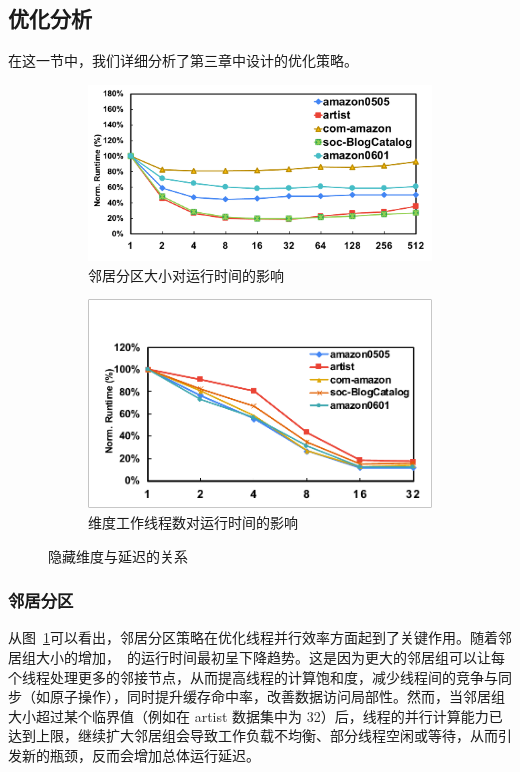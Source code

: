\subsection{优化分析}
在这一节中，我们详细分析了第三章中设计的优化策略。
\begin{figure}[htbp]
    \centering
    \begin{subfigure}[b]{0.48\textwidth}
        \centering
        \includegraphics[width=\textwidth]{images/group-size-study.pdf}
        \caption{邻居分区大小对运行时间的影响}
        \label{fig:group-size-study}
    \end{subfigure}
    \hfill
    \begin{subfigure}[b]{0.48\textwidth}
        \centering
        \includegraphics[width=\textwidth]{images/dimension-worker-1.pdf}
        \caption{维度工作线程数对运行时间的影响}
        \label{fig:dimension-worker}
    \end{subfigure}
    \caption{隐藏维度与延迟的关系}
    \label{fig:关于邻居分区和维度分区的研究}
\end{figure}
\subsubsection{邻居分区}
从图~\ref{fig:group-size-study}可以看出，邻居分区策略在优化线程并行效率方面起到了关键作用。随着邻居组大小的增加，~\Mname{}的运行时间最初呈下降趋势。这是因为更大的邻居组可以让每个线程处理更多的邻接节点，从而提高线程的计算饱和度，减少线程间的竞争与同步（如原子操作），同时提升缓存命中率，改善数据访问局部性。然而，当邻居组大小超过某个临界值（例如在 artist 数据集中为 32）后，线程的并行计算能力已达到上限，继续扩大邻居组会导致工作负载不均衡、部分线程空闲或等待，从而引发新的瓶颈，反而会增加总体运行延迟。
